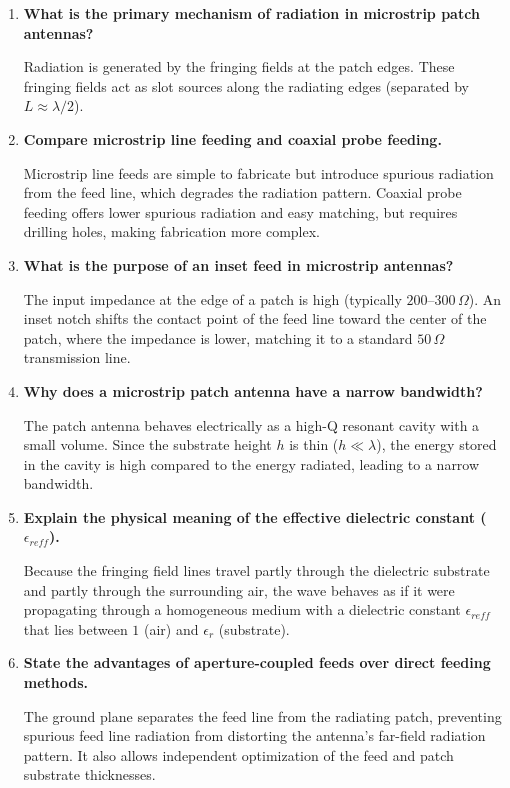 \documentclass[12pt,a4paper]{article}
\newcommand{\Q}[1]{\textbf{#1}\par\noindent\ignorespaces}
\begin{document}
\begin{tcolorbox}[exambox, title={\textbf{Frequently Asked / Viva Questions}}]
\begin{enumerate}[topsep=0pt, label=\textbf{Q\arabic*.}, itemsep=5pt]
  \item \Q{What is the primary mechanism of radiation in microstrip patch antennas?}
    Radiation is generated by the fringing fields at the patch edges. These fringing fields act as slot sources along the radiating edges (separated by $L \approx \lambda/2$).
  \item \Q{Compare microstrip line feeding and coaxial probe feeding.}
    Microstrip line feeds are simple to fabricate but introduce spurious radiation from the feed line, which degrades the radiation pattern. Coaxial probe feeding offers lower spurious radiation and easy matching, but requires drilling holes, making fabrication more complex.
  \item \Q{What is the purpose of an inset feed in microstrip antennas?}
    The input impedance at the edge of a patch is high (typically $200$–$300\,\Omega$). An inset notch shifts the contact point of the feed line toward the center of the patch, where the impedance is lower, matching it to a standard $50\,\Omega$ transmission line.
  \item \Q{Why does a microstrip patch antenna have a narrow bandwidth?}
    The patch antenna behaves electrically as a high-Q resonant cavity with a small volume. Since the substrate height $h$ is thin ($h \ll \lambda$), the energy stored in the cavity is high compared to the energy radiated, leading to a narrow bandwidth.
  \item \Q{Explain the physical meaning of the effective dielectric constant ($\epsilon_{reff}$).}
    Because the fringing field lines travel partly through the dielectric substrate and partly through the surrounding air, the wave behaves as if it were propagating through a homogeneous medium with a dielectric constant $\epsilon_{reff}$ that lies between $1$ (air) and $\epsilon_r$ (substrate).
  \item \Q{State the advantages of aperture-coupled feeds over direct feeding methods.}
    The ground plane separates the feed line from the radiating patch, preventing spurious feed line radiation from distorting the antenna's far-field radiation pattern. It also allows independent optimization of the feed and patch substrate thicknesses.
\end{enumerate}
\end{tcolorbox}
\end{document}
